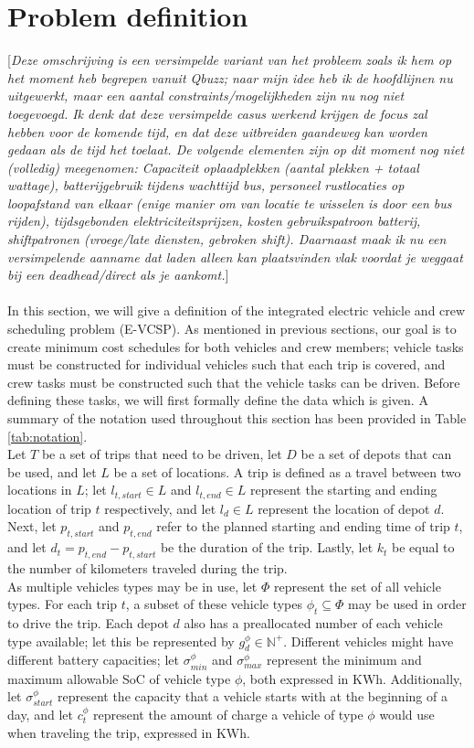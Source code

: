 \documentclass[]{article}
\newcommand{\todonocomment}[1]{{\color{red}[\textit{#1}]}}
\begin{document}
\section{Problem definition}
\label{sec:problem_def}
\todonocomment{Deze omschrijving is een versimpelde variant van het probleem zoals ik hem op het moment heb begrepen vanuit Qbuzz; naar mijn idee heb ik de hoofdlijnen nu uitgewerkt, maar een aantal constraints/mogelijkheden zijn nu nog niet toegevoegd. Ik denk dat deze versimpelde casus werkend krijgen de focus zal hebben voor de komende tijd, en dat deze uitbreiden gaandeweg kan worden gedaan als de tijd het toelaat. De volgende elementen zijn op dit moment nog niet (volledig) meegenomen: Capaciteit oplaadplekken (aantal plekken + totaal wattage), batterijgebruik tijdens wachttijd bus, personeel rustlocaties op loopafstand van elkaar (enige manier om van locatie te wisselen is door een bus rijden), tijdsgebonden elektriciteitsprijzen, kosten gebruikspatroon batterij, shiftpatronen (vroege/late diensten, gebroken shift). Daarnaast maak ik nu een versimpelende aanname dat laden alleen kan plaatsvinden vlak voordat je weggaat bij een deadhead/direct als je aankomt.} \\\\
In this section, we will give a definition of the integrated electric vehicle and crew scheduling problem (E-VCSP). As mentioned in previous sections, our goal is to create minimum cost schedules for both vehicles and crew members; vehicle tasks must be constructed for individual vehicles such that each trip is covered, and crew tasks must be constructed such that the vehicle tasks can be driven. Before defining these tasks, we will first formally define the data which is given. A summary of the notation used throughout this section has been provided in Table \ref{tab:notation}. \\
Let $T$ be a set of trips that need to be driven, let $D$ be a set of depots that can be used, and let $L$ be a set of locations. A trip is defined as a travel between two locations in $L$; let $l_{t,start} \in L$ and $l_{t,end} \in L$ represent the starting and ending location of trip $t$ respectively, and let $l_d \in L$ represent the location of depot $d$. Next, let $p_{t,start}$ and $p_{t,end}$ refer to the planned starting and ending time of trip $t$, and let $d_t = p_{t,end} - p_{t,start}$ be the duration of the trip. Lastly, let $k_t$ be equal to the number of kilometers traveled during the trip. \\
As multiple vehicles types may be in use, let $\Phi$ represent the set of all vehicle types. For each trip $t$, a subset of these vehicle types $\phi_t \subseteq \Phi$ may be used in order to drive the trip. Each depot $d$ also has a preallocated number of each vehicle type available; let this be represented by $g^\phi_{d} \in \mathbb{N}^+$. Different vehicles might have different battery capacities; let $\sigma^\phi_{min}$ and $\sigma^\phi_{max}$ represent the minimum and maximum allowable SoC of vehicle type $\phi$, both expressed in KWh. Additionally, let $\sigma^\phi_{start}$ represent the capacity that a vehicle starts with at the beginning of a day, and let $c^\phi_t$ represent the amount of charge a vehicle of type $\phi$ would use when traveling the trip, expressed in KWh. \\
\end{document}
